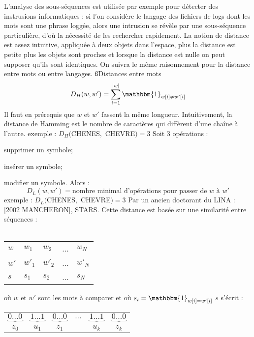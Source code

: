 \documentclass[a4paper,11pt]{article}
\begin{document}
 \p L'analyse des sous-séquences est utilisée par exemple pour détecter des
 instrusions informatiques : si l'on considère le langage des fichiers de logs
 dont les mots sont une phrase loggée, alors une intrusion se révèle par une
 sous-séquence particulière, d'où la nécessité de les rechercher rapidement.
 La notion de distance est assez intuitive, appliquée à deux objets
 dans l'espace, plus la distance est petite plus les objets sont
 proches et lorsque la distance est nulle on peut supposer qu'ils sont
 identiques. On suivra le même raisonnement pour la distance entre
 mots ou entre langages.
 \ss{Distances entre mots}
  \[
  D_H(w, w') = \sum^{\mid{}w\mid}_{i = 1} \mathbbm{1}_{w[i] \neq w'[i]}
  \]
  \p Il faut en prérequis que $w$ et $w'$ fassent la même longueur.
  Intuitivement, la distance de Hamming est le nombre de caractères qui
  diffèrent d'une chaîne à l'autre.
  \p exemple : $D_H($CHENES$,$ CHEVRE$)=3$
  \p Soit 3 opérations :\\
  \bi
   \item supprimer un symbole;
   \item insérer un symbole;
   \item modifier un symbole.
  \ei
  \p Alors :
  \[
  D_L(w, w') = \text{nombre minimal d'opérations pour passer de }w\text{ à }w'
  \]
  \p exemple : $D_L($CHENES$,$ CHEVRE$)=3$
  \p Par un ancien doctorant du LINA : [2002 MANCHERON], STARS.
  \p Cette distance est basée sur une similarité entre séquences :\\ \\
  \begin{tabular}{ l | l l l l }
   $w$  & $w_1$  & $w_2$  & ... & $w_N$  \\
   $w'$ & $w'_1$ & $w'_2$ & ... & $w'_N$ \\ \hline
   $s$  & $s_1$ & $s_2$ & ... & $s_N$ \\
  \end{tabular}
  \p où $w$ et $w'$ sont les mots à comparer et où
  $s_i=\mathbbm{1}_{w[i] = w'[i]}$
  \p $s$ s'écrit :
  \begin{tabular}{ c c c c c c }
   $\underbrace{0...0}$ &
   $\underbrace{1...1}$ &
   $\underbrace{0...0}$ &
   $...$                &
   $\underbrace{1...1}$ &
   $\underbrace{0...0}$ \\
   $z_0$                &
   $u_1$                &
   $z_1$                &
                        &
   $u_k$                &
   $z_k$                \\
  \end{tabular}
\end{document}
